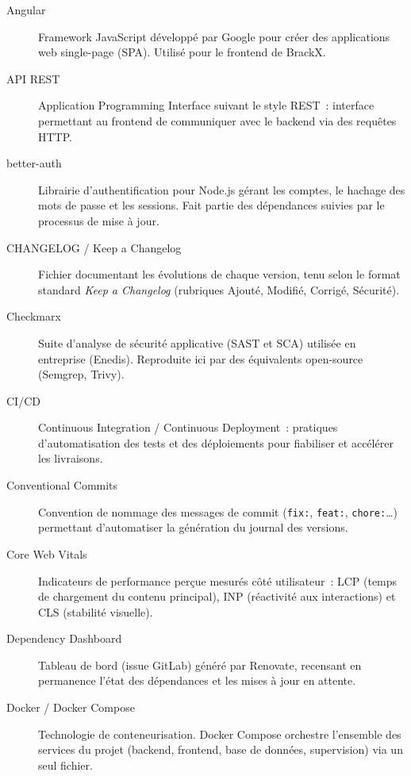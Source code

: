 \begin{description}
    \item[Angular] Framework JavaScript développé par Google pour créer des applications web single-page (SPA). Utilisé pour le frontend de BrackX.

    \item[API REST] Application Programming Interface suivant le style REST~: interface permettant au frontend de communiquer avec le backend via des requêtes HTTP.

    \item[better-auth] Librairie d'authentification pour Node.js gérant les comptes, le hachage des mots de passe et les sessions. Fait partie des dépendances suivies par le processus de mise à jour.

    \item[CHANGELOG / Keep a Changelog] Fichier documentant les évolutions de chaque version, tenu selon le format standard \emph{Keep a Changelog} (rubriques Ajouté, Modifié, Corrigé, Sécurité).

    \item[Checkmarx] Suite d'analyse de sécurité applicative (SAST et SCA) utilisée en entreprise (Enedis). Reproduite ici par des équivalents open-source (Semgrep, Trivy).

    \item[CI/CD] Continuous Integration / Continuous Deployment~: pratiques d'automatisation des tests et des déploiements pour fiabiliser et accélérer les livraisons.

    \item[Conventional Commits] Convention de nommage des messages de commit (\texttt{fix:}, \texttt{feat:}, \texttt{chore:}\ldots) permettant d'automatiser la génération du journal des versions.

    \item[Core Web Vitals] Indicateurs de performance perçue mesurés côté utilisateur~: LCP (temps de chargement du contenu principal), INP (réactivité aux interactions) et CLS (stabilité visuelle).

    \item[Dependency Dashboard] Tableau de bord (issue GitLab) généré par Renovate, recensant en permanence l'état des dépendances et les mises à jour en attente.

    \item[Docker / Docker Compose] Technologie de conteneurisation. Docker Compose orchestre l'ensemble des services du projet (backend, frontend, base de données, supervision) via un seul fichier.


\end{description}
